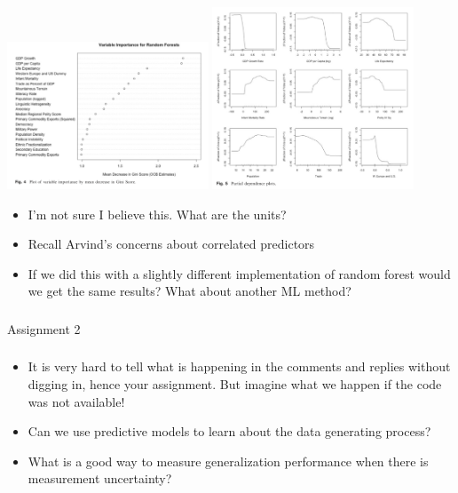 \documentclass[aspectratio=169]{beamer}
\begin{document}
\begin{frame}
\frametitle{}

\begin{center}
\includegraphics[width=0.45\textwidth]{figures/muchlinksi_comparing_2016_fig4}  \phantom{12345} \includegraphics[width=0.45\textwidth]{figures/muchlinksi_comparing_2016_fig5} 
\end{center}

\pause
\begin{itemize}
\item I'm not sure I believe this. What are the units?
\pause
\item Recall Arvind's concerns about correlated predictors
\pause
\item If we did this with a slightly different implementation of random forest would we get the same results? What about another ML method?
\end{itemize}

\end{frame}
\begin{frame}
\frametitle{}

Assignment 2

\end{frame}
\begin{frame}
\frametitle{}

\begin{itemize}
\item It is very hard to tell what is happening in the comments and replies without digging in, hence your assignment. But imagine what we happen if the code was not available!
\pause
\item Can we use predictive models to learn about the data generating process?
\pause
\item What is a good way to measure generalization performance when there is measurement uncertainty?
\end{itemize}

\end{frame}
\end{document}
